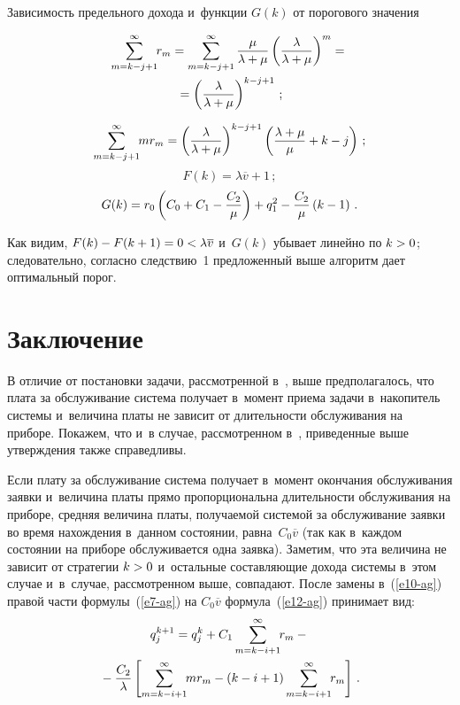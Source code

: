 \begin{multicols}{2}
 \noindent
{\small Зависимость предельного дохода и~функции $G(k)$ от порогового значения}

\vspace*{6pt}

  
  \noindent
   \begin{multline*}
   \sum\limits^\infty_{m=k-j+1}\hspace*{-1mm} r_m = \sum\limits_{m=k-j+1}^\infty \displaystyle\frac{\displaystyle \mu\mathstrut}{\displaystyle \lambda+\mu\mathstrut}\left( 
\displaystyle\frac{\displaystyle \lambda\mathstrut}{\displaystyle \lambda+\mu\mathstrut}\right)^m ={}\\
{}= \left( \displaystyle\frac{\displaystyle \lambda\mathstrut}{\displaystyle \lambda+\mu\mathstrut}\right)^{k-j+1}\,;
\end{multline*}

\vspace*{-6pt}

\noindent
   $$
   \sum\limits_{m=k-j+1}^\infty \hspace*{-1mm}mr_m =\left( \displaystyle\frac{\displaystyle \lambda\mathstrut}{\displaystyle \lambda+\mu\mathstrut}\right)^{k-j+1} \left( 
\displaystyle\frac{\displaystyle \lambda+\mu\mathstrut}{\displaystyle \mu\mathstrut}+k-j\right)\,;
   $$
   $$
   F(k) =\lambda\overline{v}+1\,;
   $$
   $$
   G(k) =r_0\left( C_0 +C_1-\displaystyle\frac{\displaystyle C_2\mathstrut}{\displaystyle \mu\mathstrut}\right) +q_1^2 -\displaystyle\frac{\displaystyle C_2\mathstrut}{\displaystyle \mu\mathstrut}\left(k-1\right)\,.
   $$
  
  Как видим, $F(k) \hm- F(k\hm+1) \hm= 0\hm< \lambda \overline{v}$ и~$G(k)$ 
убывает линейно по $k\hm>0$; следовательно, согласно следствию~1 
предложенный выше алгоритм дает оптимальный порог.
  
\section{Заключение}

  В отличие от постановки задачи, рассмотренной в~\cite{7-ag}, выше 
предполагалось, что плата за обслуживание система получает в~момент приема 
задачи в~накопитель системы и~величина платы не зависит от длительности 
обслуживания на приборе. Покажем, что и~в случае, рассмотренном  
в~\cite{7-ag}, приведенные выше утверждения также справедливы. 
  
  Если плату за обслуживание система получает в~момент окончания 
обслуживания заявки и~величина платы прямо пропорциональна длительности 
обслуживания на приборе, средняя величина платы, получаемой системой за 
обслуживание заявки во время нахождения в~данном состоянии, 
равна~$C_0\overline{v}$ (так как в~каждом состоянии на приборе 
обслуживается одна заявка). Заметим, что эта величина не зависит от стратегии 
$k\hm>0$ и~остальные составляющие дохода системы в~этом случае и~в~случае, 
рассмотренном выше, совпадают. После замены в~(\ref{e10-ag}) правой части 
формулы~(\ref{e7-ag}) на $C_0\overline{v}$ формула~(\ref{e12-ag}) принимает 
вид:
  \begin{multline*}
  q_j^{k+1} =q_j^k +C_1\sum\limits_{m=k-i+1}^\infty \hspace*{-1mm}r_m-{}\\
  {}- \displaystyle\frac{\displaystyle C_2\mathstrut}{\displaystyle \lambda\mathstrut} \left [ \sum\limits_{m=k-i+1}^\infty \hspace*{-1mm}mr_m -(k-i+1) 
\sum\limits_{m=k-i+1}^\infty \hspace*{-1mm}r_m\right]\,.
  \end{multline*}
  

\end{multicols}
